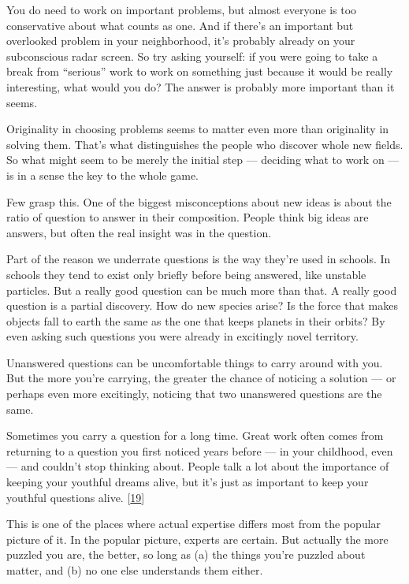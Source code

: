 You do need to work on important problems, but almost everyone is too
conservative about what counts as one. And if there's an important but
overlooked problem in your neighborhood, it's probably already on your
subconscious radar screen. So try asking yourself: if you were going to
take a break from ``serious'' work to work on something just because it
would be really interesting, what would you do? The answer is probably
more important than it seems.

Originality in choosing problems seems to matter even more than
originality in solving them. That's what distinguishes the people who
discover whole new fields. So what might seem to be merely the initial
step --- deciding what to work on --- is in a sense the key to the whole
game.

Few grasp this. One of the biggest misconceptions about new ideas is
about the ratio of question to answer in their composition. People think
big ideas are answers, but often the real insight was in the question.

Part of the reason we underrate questions is the way they're used in
schools. In schools they tend to exist only briefly before being
answered, like unstable particles. But a really good question can be
much more than that. A really good question is a partial discovery. How
do new species arise? Is the force that makes objects fall to earth the
same as the one that keeps planets in their orbits? By even asking such
questions you were already in excitingly novel territory.

Unanswered questions can be uncomfortable things to carry around with
you. But the more you're carrying, the greater the chance of noticing a
solution --- or perhaps even more excitingly, noticing that two
unanswered questions are the same.

Sometimes you carry a question for a long time. Great work often comes
from returning to a question you first noticed years before --- in your
childhood, even --- and couldn't stop thinking about. People talk a lot
about the importance of keeping your youthful dreams alive, but it's
just as important to keep your youthful questions alive.
{[}\hyperref[f19n]{19}{]}

This is one of the places where actual expertise differs most from the
popular picture of it. In the popular picture, experts are certain. But
actually the more puzzled you are, the better, so long as (a) the things
you're puzzled about matter, and (b) no one else understands them
either.

